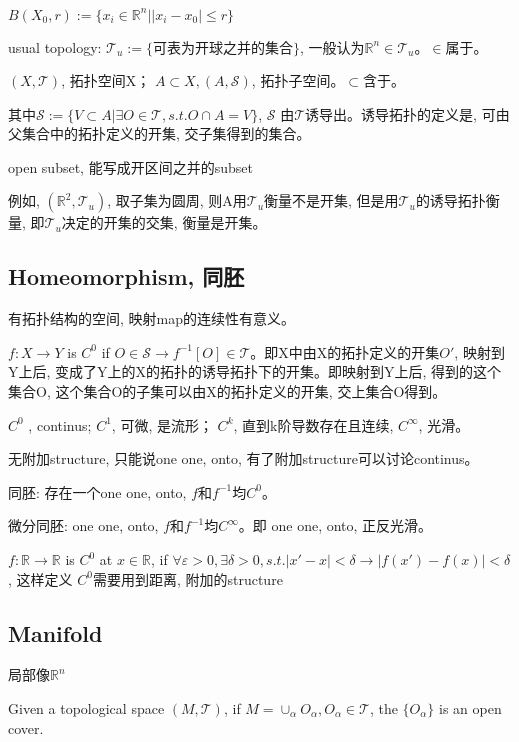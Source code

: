 \documentclass[UTF8]{../09-Mathematics}
\begin{document}
$B(X_0, r) := \{ x_i \in \mathbb{R}^n |   |x_i - x_0| \leq r\}$

usual topology: $\mathscr T_u := \{ \mbox{可表为开球之并的集合}\}$, 一般认为$\mathbb{R}^n \in \mathscr T_u $。$\in$属于。

$(X, \mathscr T)$, 拓扑空间X；
$A \subset X,  (A, \mathscr S)$,  拓扑子空间。$ \subset $含于。

其中$\mathscr S := \{  V \subset A | \exists O \in \mathscr T, s.t. O \cap A = V\}$, $\mathscr S$ 由$\mathscr T$诱导出。诱导拓扑的定义是, 可由父集合中的拓扑定义的开集, 交子集得到的集合。

open subset, 能写成开区间之并的subset 

例如, $(\mathbb R^2, \mathscr T_u)$, 取子集为圆周, 则A用$\mathscr T_u$衡量不是开集, 但是用$\mathscr T_u$的诱导拓扑衡量, 即$\mathscr T_u$决定的开集的交集, 衡量是开集。


\subsection{Homeomorphism, 同胚}

有拓扑结构的空间, 映射map的连续性有意义。

$f:X \to Y$ is $C^0$ if $ O \in \mathscr S \rightarrow f^{-1}[O] \in \mathscr T$。即X中由X的拓扑定义的开集$O'$, 映射到Y上后, 变成了Y上的X的拓扑的诱导拓扑下的开集。即映射到Y上后, 得到的这个集合O, 这个集合O的子集可以由X的拓扑定义的开集, 交上集合O得到。

$C^0$ ,  continus; $C^1$, 可微, 是流形； $C^k$, 直到k阶导数存在且连续,  $C^\infty$, 光滑。


无附加structure, 只能说one one, onto,  有了附加structure可以讨论continus。

同胚: 存在一个one one, onto,  $f$和$f^{-1}$均$C^0$。

微分同胚: one one, onto,  $f$和$f^{-1}$均$C^\infty$。即 one one, onto,  正反光滑。

$f: \mathbb{R} \to \mathbb{R} $ is $C^0$ at $x\in  \mathbb{R}$, if $\forall \varepsilon >0, \exists \delta >0, s.t. |x' - x| < \delta \rightarrow |f(x') - f(x)| <   \delta$, 这样定义 $C^0$需要用到距离, 附加的structure


\subsection{Manifold}

局部像$\mathbb R ^n$


Given a topological space $(M, \mathscr T)$, if $M = \cup _ \alpha O_\alpha , O_\alpha \in \mathscr T$, the $\{ O_\alpha\}$ is an open cover.
\end{document}

